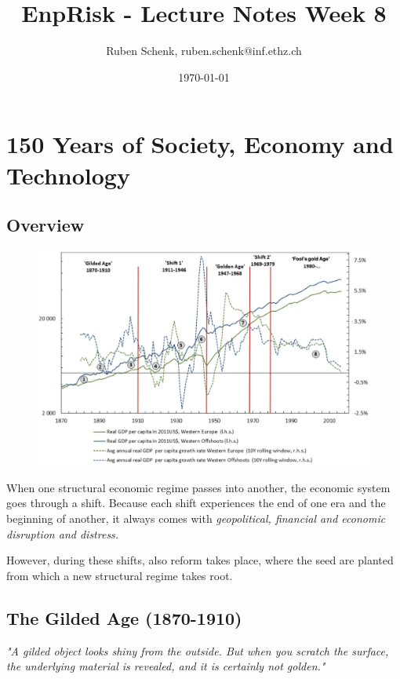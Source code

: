 \documentclass[a4paper]{extarticle}
\title{EnpRisk - Lecture Notes Week 8}
\author{Ruben Schenk, ruben.schenk@inf.ethz.ch}
\date{\today}
\begin{document}
\maketitle

\section{150 Years of Society, Economy and Technology}

\subsection{Overview}

\begin{figure}[H]
    \includegraphics[width=15cm]{../images/EnpRisk_Fig8-1}
    \centering
\end{figure}

When one structural economic regime passes into another, the economic system goes through a shift. Because each shift experiences the end of one era and the beginning of another, it always comes with \textit{geopolitical, financial and economic disruption and distress.}

However, during these shifts, also reform takes place, where the seed are planted from which a new structural regime takes root.

\subsection{The Gilded Age (1870-1910)}

\textit{"A gilded object looks shiny from the outside. But when you scratch the surface, the underlying material is revealed, and it is certainly not golden."}
\end{document}
